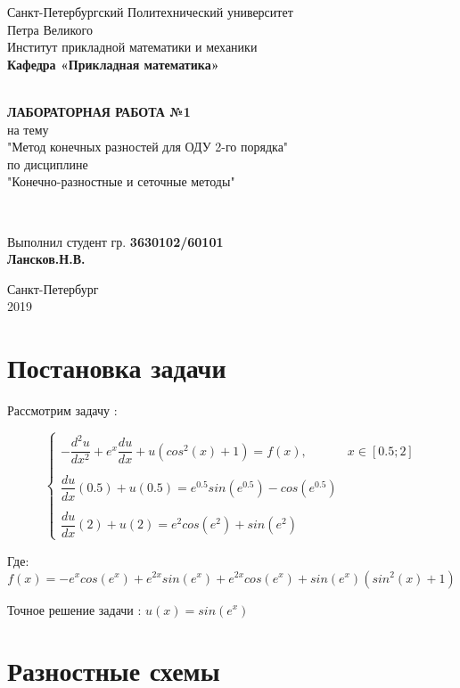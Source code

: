 \documentclass[12pt]{article}
\renewcommand{\listoffigures}{\begingroup  %
\tocsection
\tocfile{\listfigurename}{lof}
\endgroup}
\renewcommand{\listoftables}{\begingroup  %
\tocsection
\tocfile{\listtablename}{lot}
\endgroup}
\begin{document}
\begin{titlepage}
	\center
		Санкт-Петербургский Политехнический 
		университет \\ Петра Великого\\
		Институт прикладной математики и механики
		\\ \textbf{Кафедра «Прикладная математика»}

	\vfill ~
	\textbf{
		\\ \large ЛАБОРАТОРНАЯ РАБОТА №1
	}
	\\	на тему 
	\\ "Метод конечных разностей для ОДУ 2-го порядка"
	\\ по дисциплине
	\\ "Конечно-разностные и сеточные методы"

	\vfill ~

	Выполнил студент гр. \textbf{3630102/60101} \\
	\textbf{Лансков.Н.В.} \\ 

\vfill

{\large}	Санкт-Петербург
\\ 2019
\end{titlepage}


\tableofcontents 
\newpage
\listoffigures
\newpage
\listoftables
\newpage

\section{Постановка задачи}

Рассмотрим задачу :

$$
\begin{cases}
-\dfrac{d^2u}{dx^2} + e^x\dfrac{du}{dx} + u(cos^2(x) + 1) = f(x), & x \in [0.5;2] \\ \\
\dfrac{du}{dx}(0.5) + u(0.5) = e^{0.5}sin(e^{0.5}) - cos(e^{0.5}) \\ \\
\dfrac{du}{dx}(2) + u(2) = e^2cos(e^2) + sin(e^2)
\end{cases}
$$

Где:
$$
f(x) = -e^xcos(e^x) + e^{2x}sin(e^x) + e^{2x}cos(e^x) + sin(e^x)(sin^2(x) + 1)
$$

Точное решение задачи : $u(x) = sin(e^x)$ 
\section{Разностные схемы}
\end{document}
